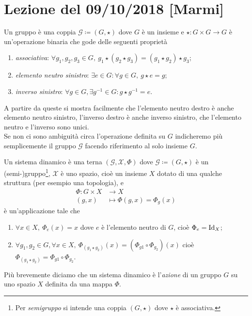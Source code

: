 \section{Lezione del 09/10/2018 [Marmi]}
\begin{definition}[gruppo]
	Un gruppo è una coppia $ \mathcal{G} \coloneqq (G, \star) $ dove $ G $ è un insieme e $ {\star \colon G \times G \to G} $ è un'operazione binaria che gode delle seguenti proprietà
	\begin{enumerate}[label=(\roman*)]
		\item \emph{associativa}: $ \forall g_1, g_2, g_3 \in G, \ g_1 \star (g_2 \star g_3) = (g_1 \star g_2) \star g_3 $;
		\item \emph{elemento neutro sinistro}: $  \exists e \in G : \forall g \in G, \ g \star e = g $;
		\item \emph{inverso sinistro}: $ \forall g \in G, \exists g^{-1} \in G : g \star g^{-1} = e $.
	\end{enumerate}
	A partire da queste si mostra facilmente che l'elemento neutro destro è anche elemento neutro sinistro, l'inverso destro è anche inverso sinistro, che l'elemento neutro e l'inverso sono unici. \\
	Se non ci sono ambiguità circa l'operazione definita su $ G $ indicheremo più semplicemente il gruppo $ \mathcal{G} $ facendo riferimento al solo insieme $ G $. 
\end{definition}

\begin{definition} \label{def:sistema-dinamico}
	Un sistema dinamico è una terna $ (\mathcal{G}, \mathcal{X}, \Phi) $ dove $ {\mathcal{G} \coloneqq (G, \star)} $ è un (semi-)gruppo\footnote{Per \emph{semigruppo} si intende una coppia $ (G,\star) $ dove $ \star $ è associativa.}, $ \mathcal{X} $ è uno spazio, cioè un insieme $ X $ dotato di una qualche struttura (per esempio una topologia), e 
	\begin{align*}
		\Phi \colon G \times X & \to X \\
		(g, x) & \mapsto \Phi(g, x) = \Phi_g(x)
	\end{align*}
	è un'applicazione tale che
	\begin{enumerate}[label=(\roman*)]
		\item $ \forall x \in X, \ \Phi_e(x) = x $ dove $ e $ è l'elemento neutro di $ G $, cioè $ \Phi_e = \mathrm{Id}_X $;
		\item $ \forall g_1, g_2 \in G, \forall x \in X, \ \Phi_{(g_1 \star g_2)}(x) = (\Phi_{g1} \circ \Phi_{g_2})(x) $ cioè $ \Phi_{(g_1 \star g_2)} = \Phi_{g1} \circ \Phi_{g_2} $.
	\end{enumerate}
	Più brevemente diciamo che un sistema dinamico è l'\emph{azione} di un gruppo $ G $ su uno spazio $ X $ definita da una mappa $ \Phi $. 
\end{definition}

